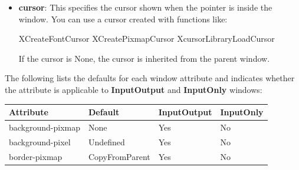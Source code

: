 \documentclass{report}
\begin{document}
\begin{itemize}
\begin{itemize}
                    \bigbreak \noindent 
                    A colormap maps pixel values to actual colors, depending on the visual class.
                    \bigbreak \noindent 
                    For common TrueColor visuals, you usually use the default colormap:
                    \bigbreak \noindent 
                    But if you create a window using a non-default visual, you often need to create and assign a matching colormap:
                    \bigbreak \noindent 
                    \begin{cppcode}
                        Colormap cmap = XCreateColormap(display, root, visual, AllocNone);
                        attrs.colormap = cmap;
                    \end{cppcode}
                    \bigbreak \noindent 
                    This is especially important when creating windows with 32-bit ARGB visuals for transparency. The window’s visual and colormap must be compatible.
                \item \textbf{cursor}: This specifies the cursor shown when the pointer is inside the window.
                    \bigbreak \noindent 
                    You can use a cursor created with functions like:
                    \bigbreak \noindent 
                    \begin{cppcode}
                        XCreateFontCursor
                        XCreatePixmapCursor
                        XcursorLibraryLoadCursor
                    \end{cppcode}
                    \bigbreak \noindent 
                    If the cursor is None, the cursor is inherited from the parent window.
            \end{itemize}
            \bigbreak \noindent 
            The following lists the defaults for each window attribute and indicates whether the attribute is applicable to \textbf{InputOutput} and \textbf{InputOnly} windows:
            \bigbreak \noindent 
            \begin{center}
                \begin{tabularx}{\textwidth}{@{}XXll@{}}
                    \toprule
                    \textbf{Attribute}& \textbf{Default}& \textbf{InputOutput}& \textbf{InputOnly} \\
                    \midrule
                    background-pixmap &None &Yes &No\\[2ex]
                    background-pixel &Undefined &Yes &No\\[2ex]
                    border-pixmap &CopyFromParent &Yes &No\\[2ex]

\end{tabularx}
\end{center}
\end{itemize}
\end{document}
